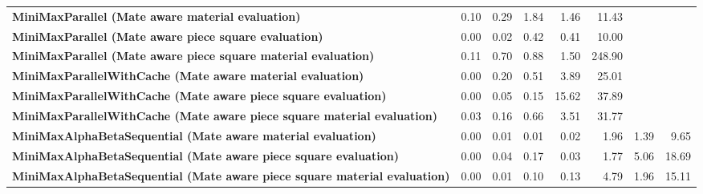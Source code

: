 \begin{table}[H]
{\begin{tabular}{|p{8cm}|*{7}{r|}}
            \rowcolor[HTML]{FFFFFF}
            \textbf{MiniMaxParallel (Mate aware material evaluation)}                                  & 0.10                                  & 0.29                                  & 1.84                                  & 1.46                                  & 11.43 &  &  \\
            \rowcolor[HTML]{EFEFEF}
            \textbf{MiniMaxParallel (Mate aware piece square evaluation)}                              & 0.00                                  & 0.02                                  & 0.42                                  & 0.41 & 10.00 &  &  \\
            \rowcolor[HTML]{FFFFFF}
            \textbf{MiniMaxParallel (Mate aware piece square material evaluation)}                     & 0.11                                  & 0.70 & 0.88 & 1.50 & 248.90 &  &  \\

            \rowcolor[HTML]{EFEFEF}
            \textbf{MiniMaxParallelWithCache (Mate aware material evaluation)}                         & 0.00                                  & 0.20                                  & 0.51 & 3.89 & 25.01 &  &  \\
            \rowcolor[HTML]{FFFFFF}
            \textbf{MiniMaxParallelWithCache (Mate aware piece square evaluation)}                     & 0.00                                  & 0.05 & 0.15 & 15.62 & 37.89 &  &  \\
            \rowcolor[HTML]{EFEFEF}
            \textbf{MiniMaxParallelWithCache (Mate aware piece square material evaluation)}            & 0.03 & 0.16 & 0.66 & 3.51 & 31.77 &  &  \\

            \rowcolor[HTML]{FFFFFF}
            \textbf{MiniMaxAlphaBetaSequential (Mate aware material evaluation)}                       & 0.00                                  & 0.01                                  & 0.01 & 0.02 & 1.96 & 1.39 & 9.65 \\
            \rowcolor[HTML]{EFEFEF}
            \textbf{MiniMaxAlphaBetaSequential (Mate aware piece square evaluation)}                   & 0.00                                  & 0.04 & 0.17 & 0.03 & 1.77 & 5.06 & 18.69 \\
            \rowcolor[HTML]{FFFFFF}
            \textbf{MiniMaxAlphaBetaSequential (Mate aware piece square material evaluation)}               & 0.00 & 0.01 & 0.10 & 0.13 & 4.79 & 1.96 & 15.11 \\


\end{tabular}}
\end{table}
